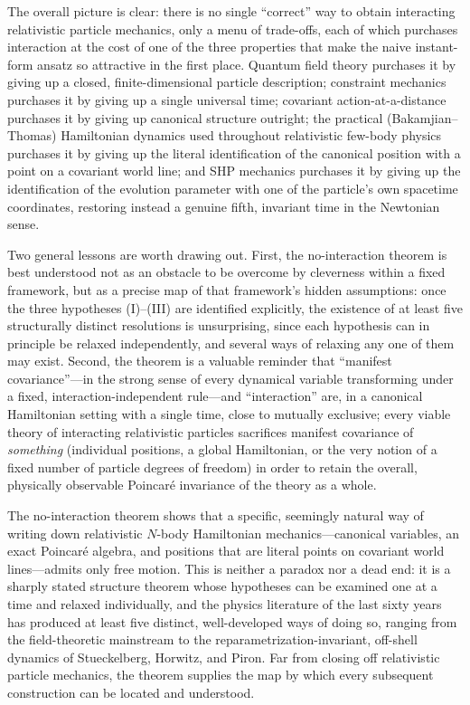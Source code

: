  The overall picture is clear: there is no single ``correct'' way to obtain
 interacting relativistic particle mechanics, only a menu of trade-offs, each
 of which purchases interaction at the cost of one of the three properties that
 make the naive instant-form ansatz so attractive in the first place. Quantum
 field theory purchases it by giving up a closed, finite-dimensional particle
 description; constraint mechanics purchases it by giving up a single universal
 time; covariant action-at-a-distance purchases it by giving up canonical
 structure outright; the practical (Bakamjian--Thomas) Hamiltonian dynamics
 used throughout relativistic few-body physics purchases it by giving up the
 literal identification of the canonical position with a point on a covariant
 world line; and SHP mechanics purchases it by giving up the identification of
 the evolution parameter with one of the particle's own spacetime coordinates,
 restoring instead a genuine fifth, invariant time in the Newtonian sense.

Two general lessons are worth drawing out. First, the no-interaction theorem is
best understood not as an obstacle to be overcome by cleverness within a fixed
framework, but as a precise map of that framework's hidden assumptions: once
the three hypotheses (I)--(III) are identified explicitly, the existence of at
least five structurally distinct resolutions is unsurprising, since each
hypothesis can in principle be relaxed independently, and several ways of
relaxing any one of them may exist. Second, the theorem is a valuable reminder
that ``manifest covariance''---in the strong sense of every dynamical variable
transforming under a fixed, interaction-independent rule---and ``interaction''
are, in a canonical Hamiltonian setting with a single time, close to mutually
exclusive; every viable theory of interacting relativistic particles sacrifices
manifest covariance of \emph{something} (individual positions, a global
Hamiltonian, or the very notion of a fixed number of particle degrees of
freedom) in order to retain the overall, physically observable Poincar\'e
invariance of the theory as a whole.

The no-interaction theorem shows that a specific, seemingly natural way of
writing down relativistic $N$-body Hamiltonian mechanics---canonical variables,
an exact Poincar\'e algebra, and positions that are literal points on covariant
world lines---admits only free motion. This is neither a paradox nor a dead
end: it is a sharply stated structure theorem whose hypotheses can be examined
one at a time and relaxed individually, and the physics literature of the last
sixty years has produced at least five distinct, well-developed ways of doing
so, ranging from the field-theoretic mainstream to the
reparametrization-invariant, off-shell dynamics of Stueckelberg, Horwitz, and
Piron. Far from closing off relativistic particle mechanics, the theorem
supplies the map by which every subsequent construction can be located and
understood.
